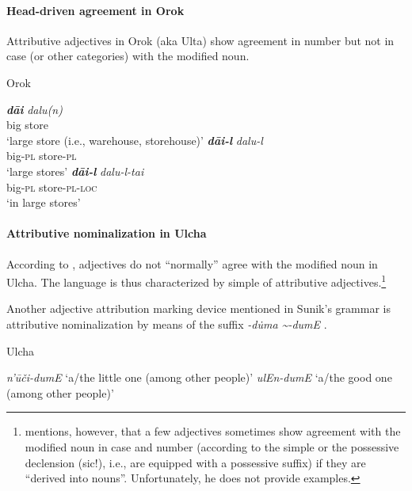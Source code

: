 \paragraph*{Head\hyp{}driven agreement in Orok}
Attributive adjectives in Orok (aka Ulta) show agreement in number but not in case (or other categories) with the modified noun.
\begin{exe}
\ex 
\rm{Orok \citep[55]{petrova1967}}
\begin{xlist}
\ex
\gll \textit{\textbf{dāi}} \textit{dalu(n)}\\
	big store\\
\glt ‘large store (i.e., warehouse, storehouse)’
\ex 
\gll	\textit{\textbf{dāi-l}} \textit{dalu-l}\\
	big-\textsc{pl} store-\textsc{pl}\\
\glt	‘large stores’
\ex 
\gll	\textit{\textbf{dāi-l}} \textit{dalu-l-tai}\\
	big-\textsc{pl} store-\textsc{pl}-\textsc{loc}\\
\glt	‘in large stores’
\end{xlist}
\end{exe}

\paragraph*{Attributive nominalization in Ulcha}
According to \citet[36, 52–53]{sunik1985}, adjectives do not “normally” agree with the modified noun in Ulcha. The language is thus characterized by simple  of attributive adjectives.\footnote{\citet[36]{sunik1985} mentions, however, that a few adjectives sometimes show agreement with the modified noun in case and number (according to the simple or the possessive declension (sic!), i.e., are equipped with a possessive suffix) if they are “derived into nouns”. Unfortunately, he does not provide examples.}

Another adjective attribution marking device mentioned in Sunik's grammar is attributive nominalization by means of the suffix \textit{-d\.uma \textasciitilde-dumE} \citep{sunik1985}.
\begin{exe}
\ex 
\rm{Ulcha \citep[38]{sunik1985}}
\begin{xlist}
\ex \textit{n'ūči-dumE} \rm{‘a/the little one (among other people)’}
\ex \textit{ulEn-dumE} \rm{‘a/the good one (among other people)’}
\end{xlist}
\end{exe}

